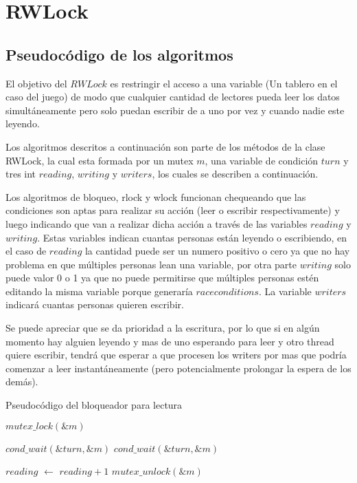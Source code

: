 \section{RWLock}

\subsection{Pseudocódigo de los algoritmos}

El objetivo del $RWLock$ es restringir el acceso a una variable (Un tablero en el caso del juego) de modo que cualquier cantidad de lectores pueda leer los datos simultáneamente pero solo puedan escribir de a uno por vez y cuando nadie este leyendo.

Los algoritmos descritos a continuación son parte de los métodos de la clase RWLock, la cual esta formada por un mutex $m$, una variable de condición $turn$ y tres int $reading$, $writing$ y $writers$, los cuales se describen a continuación.

Los algoritmos de bloqueo, rlock y wlock funcionan chequeando que las condiciones son aptas para realizar su acción (leer o escribir respectivamente) y luego indicando que van a realizar dicha acción a través de las variables $reading$ y $writing$. Estas variables indican cuantas personas están leyendo o escribiendo, en el caso de $reading$ la cantidad puede ser un numero positivo o cero ya que no hay problema en que múltiples personas lean una variable, por otra parte $writing$ solo puede valor 0 o 1 ya que no puede permitirse que múltiples personas estén editando la misma variable porque generaría $race conditions$. La variable $writers$ indicará cuantas personas quieren escribir.

Se puede apreciar que se da prioridad a la escritura, por lo que si en algún momento hay alguien leyendo y mas de uno esperando para leer y otro thread quiere escribir, tendrá que esperar a que procesen los writers por mas que podría comenzar a leer instantáneamente (pero potencialmente prolongar la espera de los demás).

\begin{algorithm}[H]
  \begin{algorithmic}[1]
  \caption{Pseudocódigo del bloqueador para lectura}
  \label{algo:3-1}
	\State $mutex\_lock(\&m)$

		\State $ cond\_wait(\&turn, \&m) $
	\EndWhile
		\State $ cond\_wait(\&turn, \&m) $
	\EndWhile
	
	\State $reading$ $\leftarrow$ $reading + 1$
	\State $mutex\_unlock(\&m)$

	\EndProcedure
	\end{algorithmic}
\end{algorithm}

